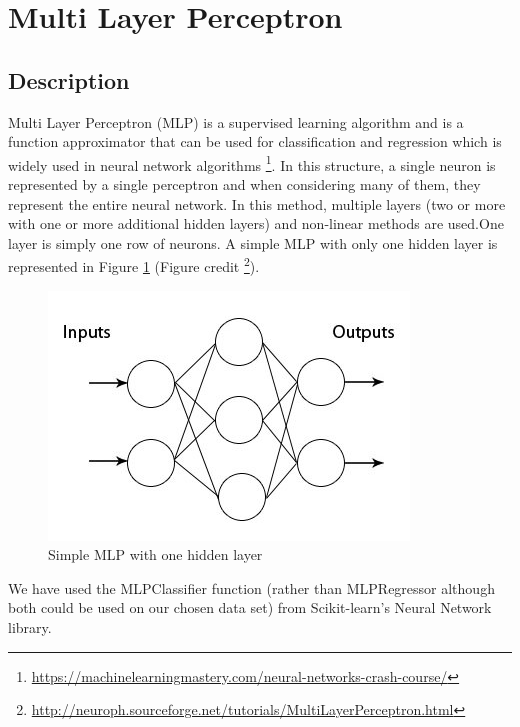 \documentclass[twocolumn]{scrartcl}
\begin{document}
\section{Multi Layer Perceptron}
\subsection{Description}
Multi Layer Perceptron (MLP) is a supervised learning algorithm and is a function approximator that can be used for classification and regression which is widely used in neural network algorithms \footnote{\url{https://machinelearningmastery.com/neural-networks-crash-course/}}.
In this structure, a single neuron is represented by a single perceptron and when considering many of them, they represent the entire neural network. In this method, multiple layers (two or more with one or more additional hidden layers) and non-linear methods are used.One layer is simply one row of neurons. A simple MLP with only one hidden layer is represented in Figure \ref{fig:mlp} (Figure credit \footnote{\url{http://neuroph.sourceforge.net/tutorials/MultiLayerPerceptron.html}}).

\begin{figure}[h]
    \centering
    \includegraphics[width=\linewidth]{images/mlp.jpeg}
    \caption{Simple MLP with one hidden layer}
    \label{fig:mlp}
\end{figure}

We have used the MLPClassifier function (rather than MLPRegressor although both could be used on our chosen data set) from Scikit-learn's Neural Network library.
\end{document}
